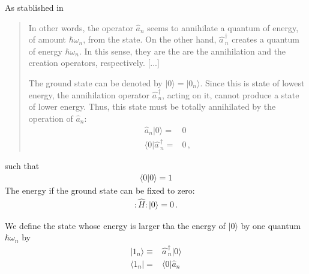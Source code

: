 As stablished in \cite{Lahiri:2005sm}
\begin{quote}
  In other words, the operator $\widehat{a}_{n}$ seems to annihilate a quantum of energy, of amount $\hbar\omega_n$, from the state. On the other hand, 
  $\widehat{a\,}_{n}^\dagger$ creates a quantum of energy $\hbar\omega_n$. In this sense, they are the are the annihilation and the creation operators, respectively. [...]

The ground state can be denoted by $|0\rangle=|0_n\rangle$. Since this is state of lowest energy, the annihilation operator $\widehat{a\,}_{n}^\dagger$,
acting on it, cannot produce a state of lower energy. Thus, this state must be totally annihilated by the operation of $\widehat{a}_{n}$:
\begin{align}
  \widehat{a}_{n}|0\rangle=&0\nonumber\\
\langle0|\widehat{a\,}_{n}^\dagger=&0\,,
\end{align}
\end{quote}
such that
\begin{align}
  \langle0|0\rangle=1
\end{align}
The energy if the ground state can be fixed to zero:
\begin{align}
  :\widehat{H}:|0\rangle=0\,.
\end{align}

We define the state whose energy is larger tha the energy of $|0\rangle$ by one quantum $\hbar\omega_n$ by
\begin{align}  
  |1_n\rangle\equiv&\widehat{a\,}_{n}^\dagger|0\rangle\nonumber\\ 
  \langle1_n|=&\langle0|\widehat{a}_{n}
\end{align}

